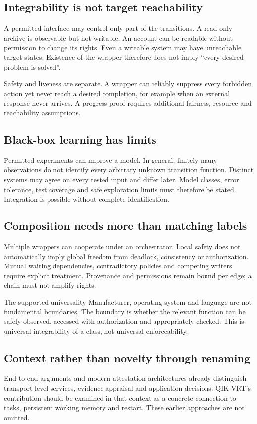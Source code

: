 \begin{cols}
\subsection*{Integrability is not target reachability}
A permitted interface may control only part of the transitions. A read-only archive is observable but not writable. An account can be readable without permission to change its rights. Even a writable system may have unreachable target states. Existence of the wrapper therefore does not imply ``every desired problem is solved''.

Safety and liveness are separate. A wrapper can reliably suppress every forbidden action yet never reach a desired completion, for example when an external response never arrives. A progress proof requires additional fairness, resource and reachability assumptions.

\subsection*{Black-box learning has limits}
Permitted experiments can improve a model. In general, finitely many observations do not identify every arbitrary unknown transition function. Distinct systems may agree on every tested input and differ later. Model classes, error tolerance, test coverage and safe exploration limits must therefore be stated. Integration is possible without complete identification.

\subsection*{Composition needs more than matching labels}
Multiple wrappers can cooperate under an orchestrator. Local safety does not automatically imply global freedom from deadlock, consistency or authorization. Mutual waiting dependencies, contradictory policies and competing writers require explicit treatment. Provenance and permissions remain bound per edge; a chain must not amplify rights.

\begin{boundary}{The supported universality}
Manufacturer, operating system and language are not fundamental boundaries. The boundary is whether the relevant function can be safely observed, accessed with authorization and appropriately checked. This is universal integrability of a class, not universal enforceability.
\end{boundary}

\subsection*{Context rather than novelty through renaming}
End-to-end arguments and modern attestation architectures already distinguish transport-level services, evidence appraisal and application decisions. QIK-VRT's contribution should be examined in that context as a concrete connection to tasks, persistent working memory and restart. These earlier approaches are not omitted. 
\end{cols}

